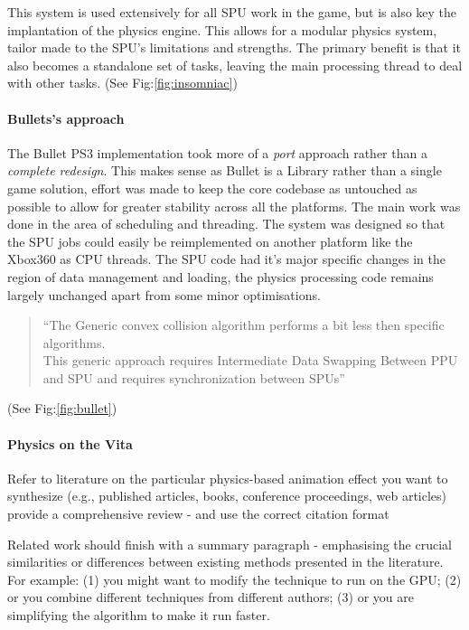 \documentclass[conference]{acmsiggraph}
\begin{document}
This system is used extensively for all SPU work in the game, but is also key the implantation of the physics engine. This allows for a modular physics system, tailor made to the SPU's limitations and strengths. The primary benefit is that it also becomes a standalone set of tasks, leaving the main processing thread to deal with other tasks.
(See Fig:\ref{fig:insomniac})

\paragraph{Bullets's approach}
The Bullet PS3 implementation took more of a \textit{port} approach rather than a \textit{complete redesign}. This makes sense as Bullet is a Library rather than a single game solution, effort was made to keep the core codebase as untouched as possible to allow for greater stability across all the platforms. The main work was done in the area of scheduling and threading. The system was designed so that the SPU jobs could easily be reimplemented on another platform like the Xbox360 as CPU threads. The SPU code had it's major specific changes in the region of data management and loading, the physics processing code remains largely unchanged apart from some minor optimisations.
\begin{quote}
``The Generic convex collision algorithm performs a bit less then specific algorithms.\\
This generic approach requires Intermediate Data Swapping Between PPU and SPU and requires synchronization between SPUs''
\cite{spuphys}
\end{quote}
(See Fig:\ref{fig:bullet})

\paragraph{Physics on the Vita}


Refer to literature on the particular physics-based animation effect you want to synthesize (e.g., published articles, books, conference proceedings, web articles) provide a comprehensive review - and use the correct citation format

Related work should finish with a summary paragraph - emphasising the crucial similarities or differences between existing methods presented in the literature.  For example: (1) you might want to modify the technique to run on the GPU; (2) or you combine different techniques from different authors; (3) or you are simplifying the algorithm to make it run faster.
\end{document}
